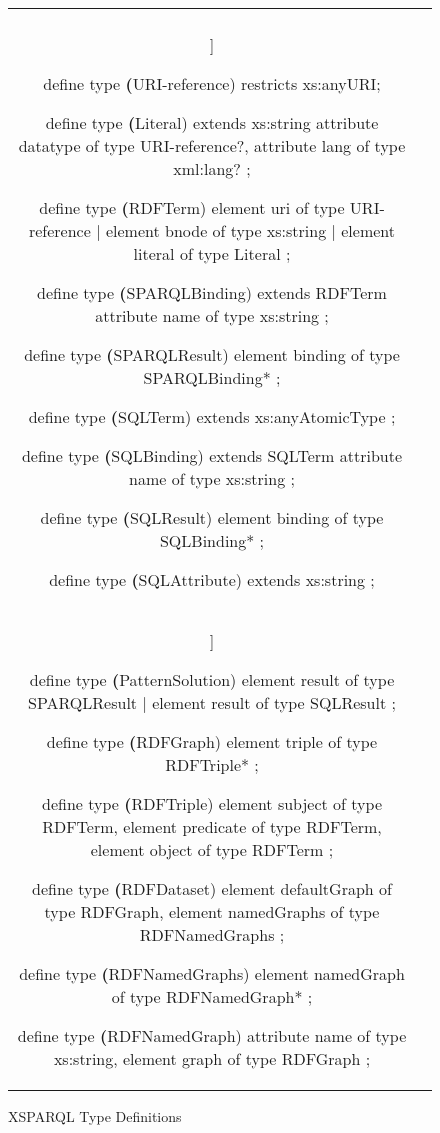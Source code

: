 \begin{figure}
  \centering
\begin{tabular}{|cc|}
\hline
\begin{minipage}{.45\linewidth}
\begin{Verbatim}[framesep=2mm,frame=none,fontsize=\scriptsize,commandchars=\\\(\)]

define type \textbf(URI-reference) restricts xs:anyURI;

define type \textbf(Literal) extends xs:string {
      attribute datatype of type URI-reference?, 
      attribute lang of type xml:lang? };

define type \textbf(RDFTerm) { 
      element uri of type URI-reference |
      element bnode of type xs:string |
      element literal of type Literal };

define type \textbf(SPARQLBinding) extends RDFTerm { 
      attribute name of type xs:string };

define type \textbf(SPARQLResult) { 
      element binding of type SPARQLBinding* };

define type \textbf(SQLTerm) extends xs:anyAtomicType ;

define type \textbf(SQLBinding) extends SQLTerm { 
      attribute name of type xs:string };

define type \textbf(SQLResult) { 
      element binding of type SQLBinding* };

define type \textbf(SQLAttribute) extends xs:string ;

  \end{Verbatim}
\end{minipage}
&
\begin{minipage}{.45\linewidth}
\begin{Verbatim}[frame=none,fontsize=\scriptsize,commandchars=\\\(\)]

define type \textbf(PatternSolution) { 
      element result of type SPARQLResult |
      element result of type SQLResult };

define type \textbf(RDFGraph) { 
      element triple of type RDFTriple* };

define type \textbf(RDFTriple) { 
      element subject of type RDFTerm,
      element predicate of type RDFTerm,
      element object of type RDFTerm };

define type \textbf(RDFDataset) { 
      element defaultGraph of type RDFGraph,
      element namedGraphs of type RDFNamedGraphs };

define type \textbf(RDFNamedGraphs) { 
      element namedGraph of type RDFNamedGraph* };

define type \textbf(RDFNamedGraph) { 
      attribute name of type xs:string,
      element graph of type RDFGraph };
  \end{Verbatim}
\end{minipage}%
\\
\hline
\end{tabular}
\caption{XSPARQL Type Definitions}
\label{verb:types}
\end{figure}



